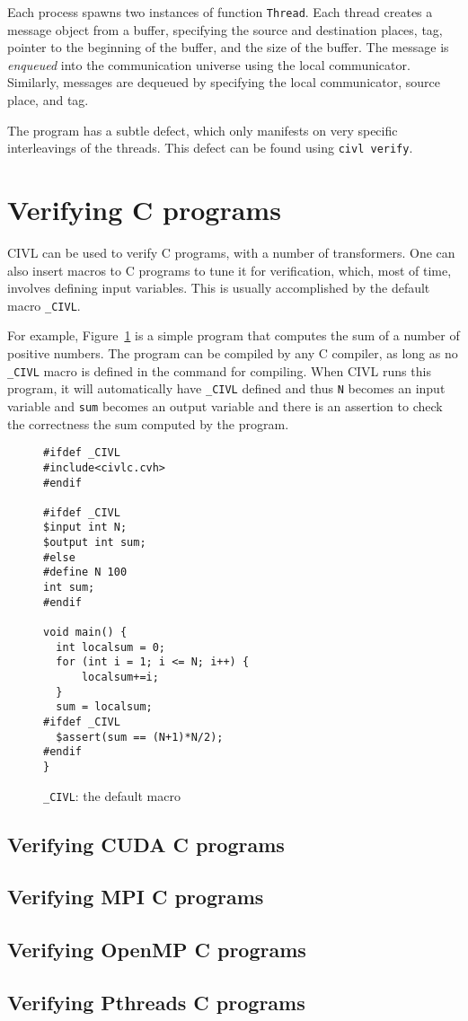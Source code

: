 Each process spawns two instances of function \texttt{Thread}.  Each
thread creates a message object from a buffer, specifying the source
and destination places, tag, pointer to the beginning of the buffer,
and the size of the buffer.  The message is \emph{enqueued} into the
communication universe using the local communicator.  Similarly,
messages are dequeued by specifying the local communicator, source
place, and tag.

The program has a subtle defect, which only manifests on very specific
interleavings of the threads.   This defect can be found using
\texttt{civl verify}.

\section{Verifying C programs}
CIVL can be used to verify C programs, with a number of transformers. One can also insert macros to C programs to tune it for verification, which, most of time, involves defining input variables. This is usually accomplished by the default macro \texttt{\_CIVL}.

For example, Figure~\ref{fig:CIVLmacro} is a simple program that computes the sum of a number of positive numbers. The program can be compiled by any C compiler, as long as no \texttt{\_CIVL} macro is defined in the command for compiling. When CIVL runs this program, it will automatically have \texttt{\_CIVL} defined and thus \texttt{N} becomes an input variable and \texttt{sum} becomes an output variable and there is an assertion to check the correctness the sum computed by the program.

\begin{figure}[H]
\begin{small}
\begin{verbatim}
#ifdef _CIVL
#include<civlc.cvh>
#endif

#ifdef _CIVL
$input int N;
$output int sum;
#else
#define N 100
int sum;
#endif

void main() {
  int localsum = 0;
  for (int i = 1; i <= N; i++) {
	  localsum+=i;
  } 
  sum = localsum;
#ifdef _CIVL
  $assert(sum == (N+1)*N/2);
#endif
}

\end{verbatim}
  \end{small}
  \caption{\texttt{\_CIVL}: the default macro}
  \label{fig:CIVLmacro}
\end{figure}

\subsection{Verifying CUDA C programs}

\subsection{Verifying MPI C programs}


\subsection{Verifying OpenMP C programs}


\subsection{Verifying Pthreads C programs}



